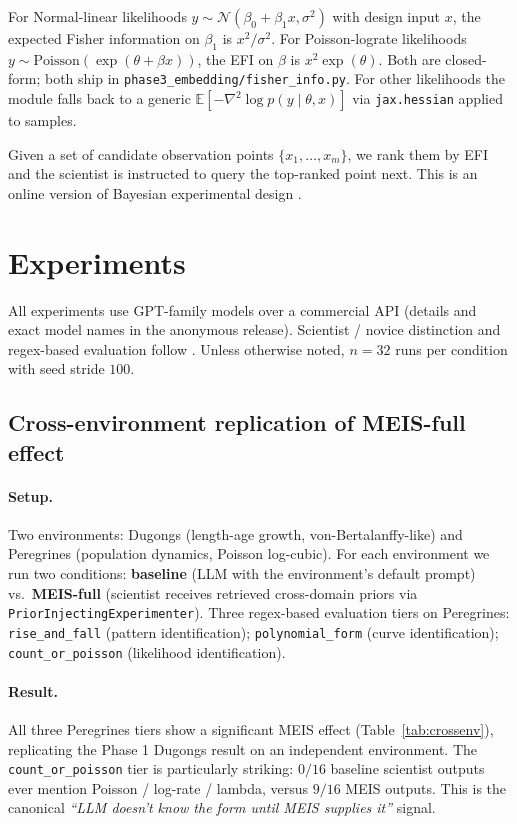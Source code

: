 \documentclass{article}
\begin{document}
For Normal-linear likelihoods $y \sim \mathcal{N}(\beta_{0} +
\beta_{1} x, \sigma^{2})$ with design input $x$, the expected Fisher
information on $\beta_{1}$ is $x^{2} / \sigma^{2}$. For Poisson-lograte
likelihoods $y \sim \mathrm{Poisson}(\exp(\theta + \beta x))$, the
EFI on $\beta$ is $x^{2} \exp(\theta)$. Both are closed-form; both
ship in \texttt{phase3\_embedding/fisher\_info.py}. For other
likelihoods the module falls back to a generic
$\mathbb{E}[- \nabla^{2} \log p(y \mid \theta, x)]$ via
\texttt{jax.hessian} applied to samples.

Given a set of candidate observation points $\{x_{1}, \ldots,
x_{m}\}$, we rank them by EFI and the scientist is instructed to
query the top-ranked point next. This is an online version of
Bayesian experimental design \citep{chaloner1995bed}.

\section{Experiments}
\label{sec:exp}

All experiments use GPT-family models
over a commercial API (details and exact model names in the
anonymous release). Scientist / novice distinction and regex-based
evaluation follow \citet{li2025boxinggym}. Unless otherwise noted,
$n = 32$ runs per condition with seed stride $100$.

\subsection{Cross-environment replication of MEIS-full effect}
\label{sec:exp-crossenv}

\paragraph{Setup.} Two environments: Dugongs (length-age growth,
von-Bertalanffy-like) and Peregrines (population dynamics,
Poisson log-cubic). For each environment we run two conditions:
\textbf{baseline} (LLM with the environment's default prompt) vs.\
\textbf{MEIS-full} (scientist receives retrieved cross-domain priors
via \texttt{PriorInjectingExperimenter}). Three regex-based evaluation
tiers on Peregrines:
\texttt{rise\_and\_fall} (pattern identification);
\texttt{polynomial\_form} (curve identification);
\texttt{count\_or\_poisson} (likelihood identification).

\paragraph{Result.} All three Peregrines tiers show a significant
MEIS effect (Table~\ref{tab:crossenv}), replicating the Phase 1
Dugongs result on an independent environment. The
\texttt{count\_or\_poisson} tier is particularly striking:
$0/16$ baseline scientist outputs ever mention Poisson / log-rate /
lambda, versus $9/16$ MEIS outputs. This is the canonical
\emph{``LLM doesn't know the form until MEIS supplies it''} signal.
\end{document}
